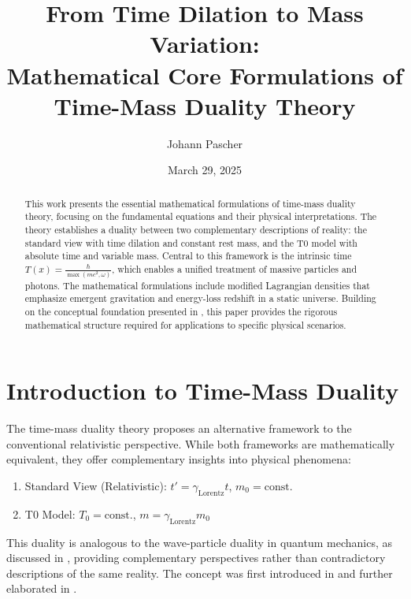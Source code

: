 \documentclass[12pt,a4paper]{article}
\title{From Time Dilation to Mass Variation: \\ Mathematical Core Formulations of Time-Mass Duality Theory}
\author{Johann Pascher}
\date{March 29, 2025}
\newcommand{\Tfield}{T(x)}
\newcommand{\Tzero}{T_0}
\newcommand{\gammaf}{\gamma_{\text{Lorentz}}}
\theoremstyle{definition}
\theoremstyle{remark}
\begin{document}
	
	\maketitle
	
	\begin{abstract}
		This work presents the essential mathematical formulations of time-mass duality theory, focusing on the fundamental equations and their physical interpretations. The theory establishes a duality between two complementary descriptions of reality: the standard view with time dilation and constant rest mass, and the T0 model with absolute time and variable mass. Central to this framework is the intrinsic time \( \Tfield = \frac{\hbar}{\max(m c^2, \omega)} \), which enables a unified treatment of massive particles and photons. The mathematical formulations include modified Lagrangian densities that emphasize emergent gravitation and energy-loss redshift in a static universe. Building on the conceptual foundation presented in \cite{pascher_zeit_masse_2025}, this paper provides the rigorous mathematical structure required for applications to specific physical scenarios.
	\end{abstract}
	
	\tableofcontents
	\newpage
	
	\section{Introduction to Time-Mass Duality}
	The time-mass duality theory proposes an alternative framework to the conventional relativistic perspective. While both frameworks are mathematically equivalent, they offer complementary insights into physical phenomena:
	\begin{enumerate}
		\item Standard View (Relativistic): \( t' = \gammaf t \), \( m_0 = \text{const.} \)
		\item T0 Model: \( \Tzero = \text{const.} \), \( m = \gammaf m_0 \)
	\end{enumerate}
	
	This duality is analogous to the wave-particle duality in quantum mechanics, as discussed in \cite{pascher_planck_2025}, providing complementary perspectives rather than contradictory descriptions of the same reality. The concept was first introduced in \cite{pascher_zeit_masse_2025} and further elaborated in \cite{pascher_zeit_2025}.
	
\end{document}
